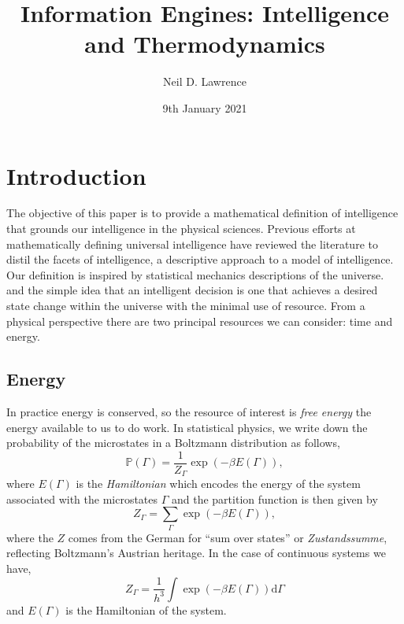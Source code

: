 \documentclass[]{article}
\title{Information Engines: Intelligence and Thermodynamics}
\author{Neil D. Lawrence}
\date{9th January 2021}
\begin{document}
\maketitle


\newcommand{\phaseVariables}{\Gamma}
\newcommand{\stateVariables}{X}
\newcommand{\nullVariables}{{X_0}}
\newcommand{\domainVariables}{{X_1}}
\newcommand{\dataVariables}{Y}
\newcommand{\measuredVariables}{S}
\newcommand{\measuredValue}{s}
\newcommand{\parameterVector}{W}
\newcommand{\separability}{{F_S}}
\newcommand{\expDist}[2]{\left\langle #1 \right\rangle_{#2}}
\newcommand{\trueProb}{\mathbb{P}}
\newcommand{\simProb}{s}
\newcommand{\domainProb}{\hat{\mathbb{P}}}
\newcommand{\physicsProb}{p}
\newcommand{\approxProb}{q}
\newcommand{\statsProb}{\pi}




\section{Introduction}

The objective of this paper is to provide a mathematical definition of intelligence that grounds our intelligence in the physical sciences. Previous efforts at mathematically defining universal intelligence \citep{Legg-universal07} have reviewed the literature to distil the facets of intelligence, a descriptive approach to a model of intelligence. Our definition is inspired by statistical mechanics descriptions of the universe.  and the simple idea that an intelligent decision is one that achieves a desired state change within the universe with the minimal use of resource. From a physical perspective there are two principal resources we can consider: time and energy. 
\subsection{Energy}

In practice energy is conserved, so the resource of interest is \emph{free energy} the energy available to us to do work.  In statistical physics, we write down the probability of the microstates in a Boltzmann distribution as follows,
\[
\mathbb{P}(\phaseVariables) = \frac{1}{Z_\phaseVariables} \exp(-\beta
E(\phaseVariables)),
\] 
where \(E(\phaseVariables)\) is the \emph{Hamiltonian} which encodes the energy of the system associated with the microstates
\(\phaseVariables\) and the partition function is then given by 
\[
Z_\phaseVariables = \sum_\phaseVariables \exp(-\beta E(\phaseVariables)),
\] 
where the \(Z\) comes from the German for ``sum over states'' or
\emph{Zustandssumme}, reflecting Boltzmann's Austrian heritage. In the
case of continuous systems we have,
\[
Z_{\phaseVariables} = \frac{1}{h^3}\int \exp(-\beta E(\phaseVariables)) \text{d} \phaseVariables
\] 
and \(E(\phaseVariables)\) is the Hamiltonian of the system.
\end{document}
